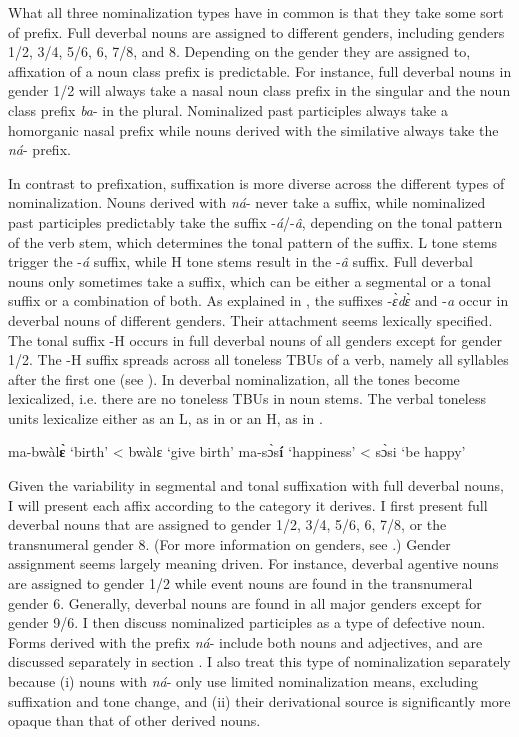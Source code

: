 What all three nominalization types have in common is that they take some sort of prefix. Full deverbal nouns are assigned to different genders, including genders 1/2, 3/4, 5/6, 6, 7/8, and 8. Depending on the gender they are assigned to, affixation of a noun class prefix is predictable. For instance, full deverbal nouns in gender 1/2 will always take a nasal noun class prefix in the singular and the noun class prefix {\itshape ba}- in the plural. Nominalized past participles always take a homorganic nasal prefix while nouns derived with the similative always take the {\itshape ná}- prefix.

In contrast to prefixation, suffixation is more diverse across the different types of nominalization.  Nouns derived with {\itshape ná}- never take a suffix, while  nominalized past participles predictably take the suffix -{\itshape á}/-{\itshape â}, depending on the tonal pattern of the verb stem, which determines the tonal pattern of the suffix. L tone stems trigger the -{\itshape á}  suffix, while H  tone stems result in the  -{\itshape â} suffix.
Full deverbal nouns only sometimes take a suffix, which can be either a segmental or a tonal suffix or a combination of both. As explained in , the suffixes -{\itshape ɛ̀dɛ̀} and -{\itshape a} occur in deverbal nouns of different genders. Their attachment seems lexically specified.
The tonal suffix -H occurs in full deverbal nouns of all genders except for gender 1/2.  The -H suffix spreads across all toneless TBUs of a verb, namely all syllables after the first one (see ). In deverbal nominalization, all the tones become lexicalized, i.e. there are no toneless TBUs in noun stems. The verbal toneless units lexicalize either as an L, as in  or an H, as in .

\ea \label{NomTBU}
\ea \label{NomTBU1} ma-bwàl{\bfseries ɛ̀ }`birth' < bwàlɛ `give birth'
\ex\label{NomTBU2} ma-sɔ̀s{\bfseries í }`happiness' < sɔ̀si `be happy'
\z
\z


Given the variability in segmental and tonal suffixation with full deverbal nouns, I will present each affix according to the category it derives. I first present full deverbal nouns that are assigned to gender 1/2, 3/4, 5/6, 6, 7/8, or the transnumeral gender 8.    
(For more information on genders, see .) Gender assignment seems largely meaning driven. For instance, deverbal agentive nouns are assigned to gender 1/2 while event nouns are found in the transnumeral gender 6. Generally, deverbal nouns are found in all major genders except for gender 9/6. I then discuss nominalized participles as a type of defective noun.
Forms derived with the prefix {\itshape ná}- include both nouns and adjectives, and are discussed separately in section  . 
I also treat this type of nominalization separately because (i) nouns with {\itshape ná}- only use limited nominalization means, excluding suffixation and tone change,  and (ii) their derivational source is significantly more opaque than that of other derived nouns.









